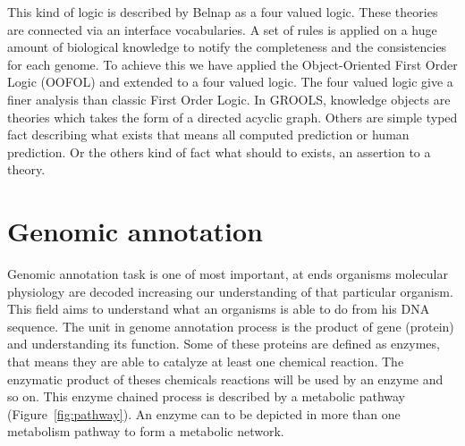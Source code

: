 \documentclass{llncs}
\begin{document}
This kind of logic is described by Belnap \cite{belnap1977useful} as a four valued logic. These theories are connected via an interface vocabularies. A set of rules is applied on a huge amount of biological knowledge to notify the completeness and the consistencies for each genome. To achieve this we have applied the Object-Oriented First Order Logic (OOFOL) \cite{amir1999object} and extended to a four valued logic. The four valued logic give a finer analysis than classic First Order Logic. In GROOLS, knowledge objects are theories which takes the form of a directed acyclic graph. Others are simple typed fact describing what exists that means all computed prediction or human prediction. Or the others kind of fact what should to exists, an assertion to a theory.

\section{Genomic annotation}

Genomic annotation task is one of most important, at ends organisms molecular physiology are decoded increasing our understanding of that particular organism. This field aims to understand what an organisms is able to do from his DNA sequence. The unit in genome annotation process is the product of gene (protein) and understanding its function. Some of these proteins are defined as enzymes, that means they are able to catalyze at least one chemical reaction. The enzymatic product of theses chemicals reactions will be used by an enzyme and so on. This enzyme chained process is described by a metabolic pathway (Figure~\ref{fig:pathway}). An enzyme can to be depicted in more than one metabolism pathway to form a metabolic network.
\end{document}
